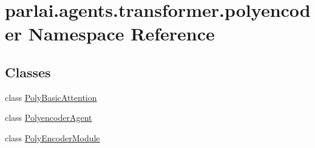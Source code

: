 \hypertarget{namespaceparlai_1_1agents_1_1transformer_1_1polyencoder}{}\section{parlai.\+agents.\+transformer.\+polyencoder Namespace Reference}
\label{namespaceparlai_1_1agents_1_1transformer_1_1polyencoder}
\subsection*{Classes}
\begin{DoxyCompactItemize}
\item 
class \hyperlink{classparlai_1_1agents_1_1transformer_1_1polyencoder_1_1PolyBasicAttention}{Poly\+Basic\+Attention}
\item 
class \hyperlink{classparlai_1_1agents_1_1transformer_1_1polyencoder_1_1PolyencoderAgent}{Polyencoder\+Agent}
\item 
class \hyperlink{classparlai_1_1agents_1_1transformer_1_1polyencoder_1_1PolyEncoderModule}{Poly\+Encoder\+Module}
\end{DoxyCompactItemize}
